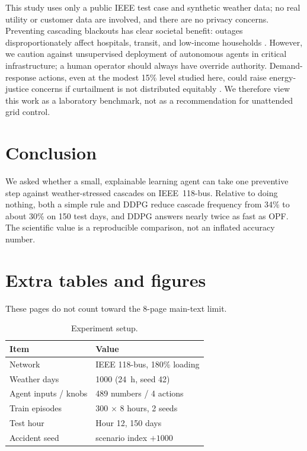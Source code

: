 \documentclass[11pt,a4paper]{article}
\begin{document}
This study uses only a public IEEE test case and synthetic weather data; no real utility or customer data are involved, and there are no privacy concerns.
Preventing cascading blackouts has clear societal benefit: outages disproportionately affect hospitals, transit, and low-income households \citep{pourbeik2006anatomy}.
However, we caution against unsupervised deployment of autonomous agents in critical infrastructure; a human operator should always have override authority.
Demand-response actions, even at the modest 15\% level studied here, could raise energy-justice concerns if curtailment is not distributed equitably \citep{siano2014demand}.
We therefore view this work as a laboratory benchmark, not as a recommendation for unattended grid control.

\section{Conclusion}

We asked whether a small, explainable learning agent can take one preventive step against weather-stressed cascades on IEEE~118-bus.
Relative to doing nothing, both a simple rule and DDPG reduce cascade frequency from 34\% to about 30\% on 150 test days, and DDPG answers nearly twice as fast as OPF.
The scientific value is a reproducible comparison, not an inflated accuracy number.




\appendix
\section{Extra tables and figures}

These pages do not count toward the 8-page main-text limit.

\begin{table}[h]
\centering
\caption{Experiment setup.}
\label{tab:setup}
\begin{tabular}{ll}
\toprule
Item & Value \\
\midrule
Network & IEEE 118-bus, 180\% loading \\
Weather days & 1000 (24~h, seed 42) \\
Agent inputs / knobs & 489 numbers / 4 actions \\
Train episodes & 300 $\times$ 8 hours, 2 seeds \\
Test hour & Hour 12, 150 days \\
Accident seed & scenario index $+ 1000$ \\
\bottomrule
\end{tabular}
\end{table}
\end{document}
